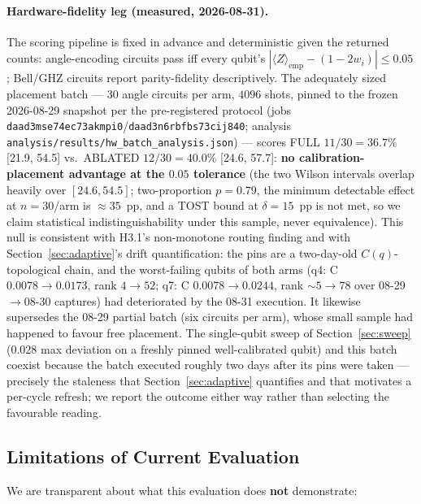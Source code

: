 ﻿\documentclass[12pt,a4paper]{article}
\begin{document}
\paragraph{Hardware-fidelity leg (measured, 2026-08-31).} The scoring pipeline is fixed in advance and deterministic given the returned counts: angle-encoding circuits pass iff every qubit's $|\langle Z\rangle_{\mathrm{emp}} - (1 - 2w_i)| \le 0.05$; Bell/GHZ circuits report parity-fidelity descriptively. The adequately sized placement batch --- 30 angle circuits per arm, $4096$ shots, pinned to the frozen 2026-08-29 snapshot per the pre-registered protocol (jobs \texttt{daad3mse74ec73akmpi0}/\texttt{daad3n6rbfbs73cij840}; analysis \texttt{analysis/results/hw\_batch\_analysis.json}) --- scores FULL $11/30 = 36.7\%$ [21.9, 54.5] vs.\ ABLATED $12/30 = 40.0\%$ [24.6, 57.7]: \textbf{no calibration-placement advantage at the $0.05$ tolerance} (the two Wilson intervals overlap heavily over $[24.6, 54.5]$; two-proportion $p = 0.79$, the minimum detectable effect at $n{=}30$/arm is $\approx 35$~pp, and a TOST bound at $\delta{=}15$~pp is not met, so we claim statistical indistinguishability under this sample, never equivalence). This null is consistent with H3.1's non-monotone routing finding and with Section~\ref{sec:adaptive}'s drift quantification: the pins are a two-day-old $C(q)$-topological chain, and the worst-failing qubits of both arms (q4: C $0.0078\to0.0173$, rank $4\to52$; q7: C $0.0078\to0.0244$, rank $\sim 5\to78$ over 08-29$\to$08-30 captures) had deteriorated by the 08-31 execution. It likewise supersedes the 08-29 partial batch (six circuits per arm), whose small sample had happened to favour free placement. The single-qubit sweep of Section~\ref{sec:sweep} ($0.028$ max deviation on a freshly pinned well-calibrated qubit) and this batch coexist because the batch executed roughly two days after its pins were taken --- precisely the staleness that Section~\ref{sec:adaptive} quantifies and that motivates a per-cycle refresh; we report the outcome either way rather than selecting the favourable reading.

\subsection{Limitations of Current Evaluation}\label{sec:limits}

We are transparent about what this evaluation does \textbf{not} demonstrate:
\end{document}
